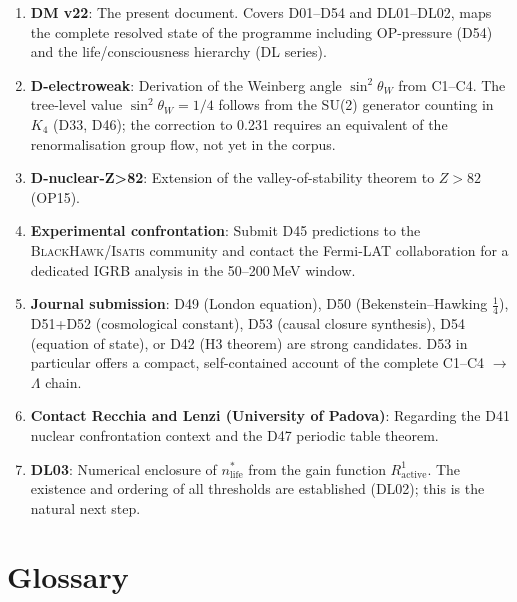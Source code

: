 \documentclass[11pt,a4paper]{article}
\theoremstyle{plain}
\theoremstyle{definition}
\theoremstyle{remark}
\begin{document}
\begin{enumerate}
\item \textbf{DM v22}: The present document. Covers D01--D54 and DL01--DL02, maps the complete resolved state of the programme including OP-pressure (D54) and the life/consciousness hierarchy (DL series).
\item \textbf{D-electroweak}: Derivation of the Weinberg angle $\sin^2\theta_W$ from C1--C4. The tree-level value $\sin^2\theta_W = 1/4$ follows from the SU(2) generator counting in $K_4$ (D33, D46); the correction to 0.231 requires an equivalent of the renormalisation group flow, not yet in the corpus.
\item \textbf{D-nuclear-Z>82}: Extension of the valley-of-stability theorem to $Z>82$ (OP15).
\item \textbf{Experimental confrontation}: Submit D45 predictions to the \textsc{BlackHawk}/\textsc{Isatis} community and contact the Fermi-LAT collaboration for a dedicated IGRB analysis in the 50--200\,MeV window.
\item \textbf{Journal submission}: D49 (London equation), D50 (Bekenstein--Hawking $\tfrac{1}{4}$), D51+D52 (cosmological constant), D53 (causal closure synthesis), D54 (equation of state), or D42 (H3 theorem) are strong candidates. D53 in particular offers a compact, self-contained account of the complete C1--C4 $\to$ $\Lambda$ chain.
\item \textbf{Contact Recchia and Lenzi (University of Padova)}: Regarding the D41 nuclear confrontation context and the D47 periodic table theorem.
\item \textbf{DL03}: Numerical enclosure of $n^*_{\mathrm{life}}$ from the gain function $R^1_{\mathrm{active}}$. The existence and ordering of all thresholds are established (DL02); this is the natural next step.
\end{enumerate}

\section{Glossary}
\label{sec:glossary}
\end{document}

